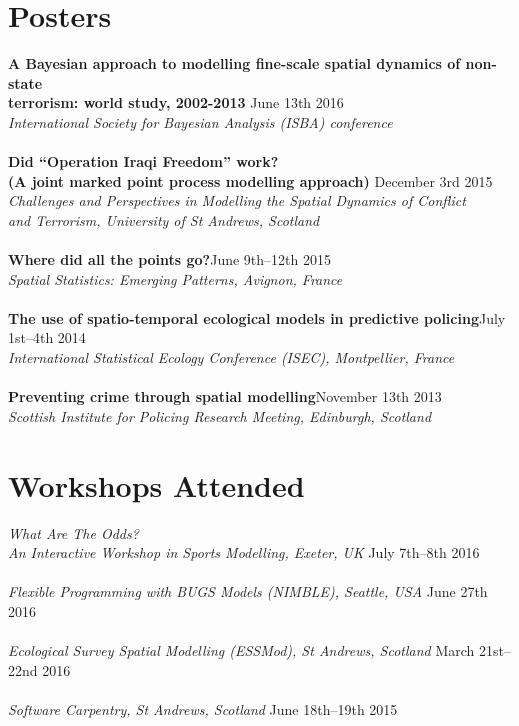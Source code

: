 \documentclass[10pt,letter]{article}
\begin{document}
 \vspace{-1mm}

\section*{Posters}
\vspace{1mm}

{\textbf {A Bayesian approach to modelling fine-scale spatial dynamics of non-state\\
 terrorism: world study, 2002-2013 }}\hfill June 13th 2016\\
 {\sl International Society for Bayesian Analysis (ISBA) conference}\\
 \hdashrule[0.5ex]{4cm}{1pt}{1pt}\\
 {\textbf{Did ``Operation Iraqi Freedom'' work? \\
(A joint marked point process modelling approach) }}\hfill December 3rd 2015\\
 {\sl Challenges and Perspectives in Modelling the Spatial Dynamics of Conflict\\ and Terrorism, University of St Andrews, Scotland}\\
 \hdashrule[0.5ex]{4cm}{1pt}{1pt}\\
{\textbf{Where did all the points go?}}\hfill June 9th--12th 2015\\
 {\sl Spatial Statistics: Emerging Patterns, Avignon, France}\\
\hdashrule[0.5ex]{4cm}{1pt}{1pt}\\
 {\textbf{The use of spatio-temporal ecological models in predictive policing}}\hfill July 1st--4th 2014\\
 {\sl International Statistical Ecology Conference (ISEC), Montpellier, France}\\
 \hdashrule[0.5ex]{4cm}{1pt}{1pt}\\
{\textbf{Preventing crime through spatial modelling}}\hfill November 13th 2013\\
 {\sl Scottish Institute for Policing Research Meeting, Edinburgh, Scotland}\\

  
\section*{Workshops Attended}
\vspace{1mm}
{\sl What Are The Odds? \\ An Interactive Workshop in Sports Modelling, Exeter, UK} \hfill July 7th--8th 2016\\
\hdashrule[0.5ex]{4cm}{1pt}{1pt}\\
{\sl Flexible Programming with BUGS Models (NIMBLE), Seattle, USA} \hfill June 27th 2016\\
\hdashrule[0.5ex]{4cm}{1pt}{1pt}\\
{\sl Ecological Survey Spatial Modelling (ESSMod), St Andrews, Scotland} \hfill March 21st--22nd 2016\\
 \hdashrule[0.5ex]{4cm}{1pt}{1pt}\\
 {\sl Software Carpentry, St Andrews, Scotland} \hfill June 18th--19th 2015\\
 \newpage
\end{document}
